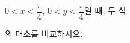 $0<x<\dfrac{\pi}{4}$, $0<y<\dfrac{\pi}{4}$일 때, 두 식\par\smallskip{}\par\smallskip\noindent 의 대소를 비교하시오. 
